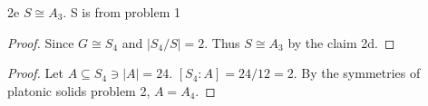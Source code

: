 \documentclass{article}
\newcommand{\abs}[1]{\lvert #1\rvert}
\begin{document}
\begin{claim}{2e}
    $S \cong A_3$. S is from problem 1
\end{claim}
\begin{proof}
    Since $G \cong S_4$ and $|S_4/S| = 2$. Thus $S \cong A_3$ by the claim 2d.
\end{proof}
\begin{proof}
    Let $A \subseteq S_4 \ni \abs{A} = 24$. $[S_4 : A] = 24/12 = 2$. By the symmetries of platonic solids problem 2, $A = A_4$.
\end{proof}
\end{document}

